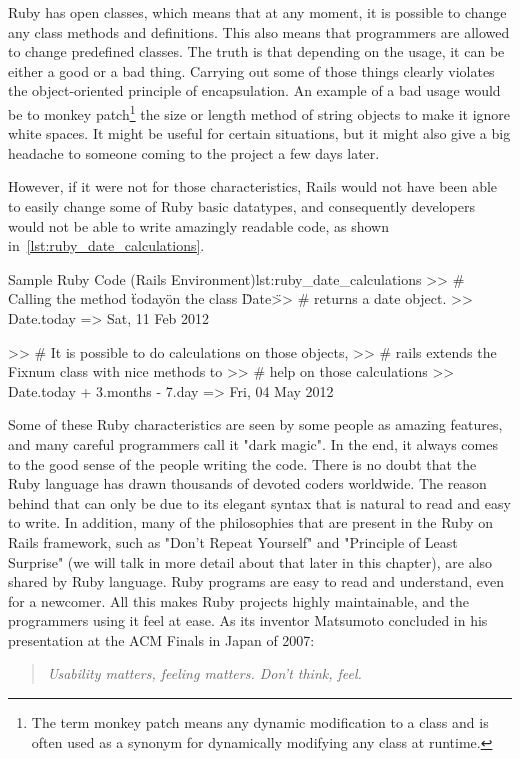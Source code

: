 Ruby has open classes, which means that at any moment, it is possible to change 
any class methods and definitions. This also means that programmers are allowed to change predefined classes.
The truth is that depending on the usage, it can be either a good or a bad thing.
Carrying out some of those things clearly violates the object-oriented principle of encapsulation. 
An example of a bad usage would be to 
\textsf{monkey patch}\footnote{
  The term monkey patch means any dynamic modification to a class and 
  is often used as a synonym for dynamically modifying any class at runtime.
} 
the size or length method of string objects to make it ignore white spaces.
It might be useful for certain situations, 
but it might also give a big headache to someone coming to the project a few days later.

However, if it were not for those characteristics, 
Rails would not have been able to easily change some of Ruby basic datatypes, and 
consequently developers would not be able to write amazingly readable code, as shown in~\ref{lst:ruby_date_calculations}.

\begin{rubycode}{Sample Ruby Code (Rails Environment)}{lst:ruby_date_calculations}
  >> # Calling the method \"today\" on the class \"Date\" 
  >> # returns a date object.
  >> Date.today 
  => Sat, 11 Feb 2012

  >> # It is possible to do calculations on those objects, 
  >> # rails extends the Fixnum class with nice methods to 
  >> # help on those calculations
  >> Date.today + 3.months - 7.day
  => Fri, 04 May 2012
\end{rubycode}

Some of these Ruby characteristics are seen by some people as amazing features, 
and many careful programmers call it "dark magic". In the end, it always comes to the 
good sense of the people writing the code. There is no doubt that 
the Ruby language has drawn thousands of devoted coders worldwide.
The reason behind that can only be due to its elegant syntax that is natural to read and easy to write. 
In addition, many of the philosophies that are present in the Ruby on Rails framework,
such as "Don't Repeat Yourself" and "Principle of Least Surprise" (we will talk in more detail about that later in this chapter), 
are also shared by Ruby language.
Ruby programs are easy to read and understand, even for a newcomer. 
All this makes Ruby projects highly maintainable, and the programmers using it feel at ease.
As its inventor Matsumoto concluded in his presentation at the ACM Finals in Japan of 2007: 
\begin{quote}\emph{
  Usability matters, feeling matters. Don't think, feel.
}\end{quote}




